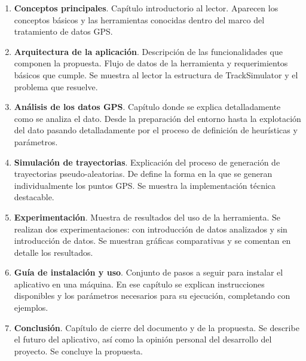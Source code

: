 \begin{enumerate}[label={C. \arabic*.}]
\item \textbf{Conceptos principales}. Capítulo introductorio al lector. Aparecen los conceptos básicos y las herramientas conocidas dentro del marco del tratamiento de datos \ac{GPS}.

\item \textbf{Arquitectura de la aplicación}. Descripción de las funcionalidades que componen la propuesta. Flujo de datos de la herramienta y requerimientos básicos que cumple. Se muestra al lector la estructura de TrackSimulator y el problema que resuelve.

\item \textbf{Análisis de los datos \ac{GPS}}. Capítulo donde se explica detalladamente como se analiza el dato. Desde la preparación del entorno hasta la explotación del dato pasando detalladamente por el proceso de definición de heurísticas y parámetros.


\item \textbf{Simulación de trayectorias}. Explicación del proceso de generación de trayectorias pseudo-aleatorias. De define la forma en la que se generan individualmente los puntos \ac{GPS}. Se muestra la implementación técnica destacable.

\item \textbf{Experimentación}. Muestra de resultados del uso de la herramienta. Se realizan dos experimentaciones: con introducción de datos analizados y sin introducción de datos. Se muestran gráficas comparativas y se comentan en detalle los resultados.

\item \textbf{Guía de instalación y uso}. Conjunto de pasos a seguir para instalar el aplicativo en una máquina. En ese capítulo se explican instrucciones disponibles y los parámetros necesarios para su ejecución, completando con ejemplos.

\item \textbf{Conclusión}. Capítulo de cierre del documento y de la propuesta. Se describe el futuro del aplicativo, así como la opinión personal del desarrollo del proyecto. Se concluye la propuesta.
\end{enumerate}


